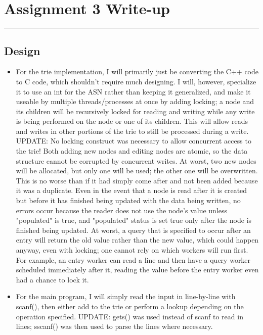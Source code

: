 \documentclass[letterpaper,10pt,fleqn]{article}
\numberwithin{equation}{section}
\begin{document}

\section*{Assignment 3 Write-up}
\hrule

\subsection*{Design}
\begin{itemize}
    \item For the trie implementation, I will primarily just be converting the C++ code to C code, which shouldn't require much designing.  I will, however, specialize it to use an int for the ASN rather than keeping it generalized, and make it useable by multiple threads/processes at once by adding locking; a node and its children will be recursively locked for reading and writing while any write is being performed on the node or one of its children.  This will allow reads and writes in other portions of the trie to still be processed during a write.  UPDATE: No locking construct was necessary to allow concurrent access to the trie!  Both adding new nodes and editing nodes are atomic, so the data structure cannot be corrupted by concurrent writes.  At worst, two new nodes will be allocated, but only one will be used; the other one will be overwritten.  This is no worse than if it had simply come after and not been added because it was a duplicate.  Even in the event that a node is read after it is created but before it has finished being updated with the data being written, no errors occur because the reader does not use the node's value unless "populated" is true, and "populated" status is set true only after the node is finished being updated.  At worst, a query that is specified to occur after an entry will return the old value rather than the new value, which could happen anyway, even with locking; one cannot rely on which workers will run first.  For example, an entry worker can read a line and then have a query worker scheduled immediately after it, reading the value before the entry worker even had a chance to lock it.
    \item For the main program, I will simply read the input in line-by-line with scanf(), then either add to the trie or perform a lookup depending on the operation specified.  UPDATE: gets() was used instead of scanf to read in lines; sscanf() was then used to parse the lines where necessary.

\end{itemize}
\end{document}
